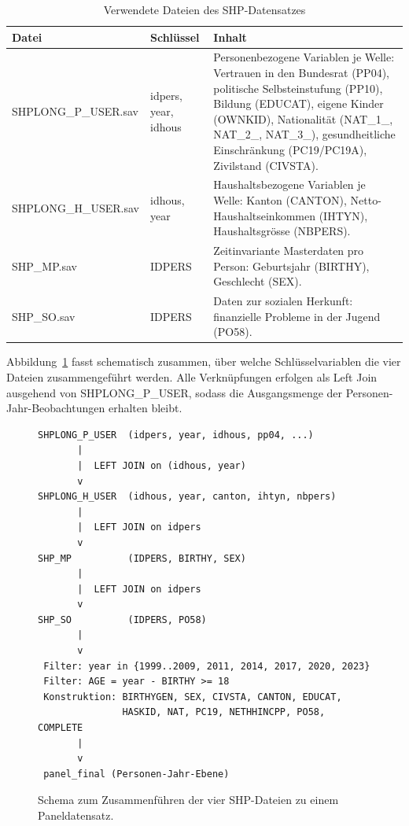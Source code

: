 \begin{table}[h]
\centering
\caption{Verwendete Dateien des SHP-Datensatzes}
\label{tab:dateien}
\renewcommand{\arraystretch}{1.2}
\begin{tabularx}{\textwidth}{@{}p{2.8cm} p{2.6cm} X@{}}
\toprule
Datei & Schlüssel & Inhalt \\
\midrule
SHPLONG\_P\_\allowbreak USER.sav &
idpers, year, idhous &
Personenbezogene Variablen je Welle: Vertrauen in den Bundesrat (PP04), politische Selbsteinstufung (PP10), Bildung (EDUCAT), eigene Kinder (OWNKID), Nationalität (NAT\_1\_, NAT\_2\_, NAT\_3\_), gesundheitliche Einschränkung (PC19/PC19A), Zivilstand (CIVSTA). \\
\addlinespace
SHPLONG\_H\_\allowbreak USER.sav &
idhous, year &
Haushaltsbezogene Variablen je Welle: Kanton (CANTON), Netto-Haushaltseinkommen (IHTYN), Haushaltsgrösse (NBPERS). \\
\addlinespace
SHP\_MP.sav &
IDPERS &
Zeitinvariante Masterdaten pro Person: Geburtsjahr (BIRTHY), Geschlecht (SEX). \\
\addlinespace
SHP\_SO.sav &
IDPERS &
Daten zur sozialen Herkunft: finanzielle Probleme in der Jugend (PO58). \\
\bottomrule
\end{tabularx}
\end{table}

Abbildung~\ref{fig:joinschema} fasst schematisch zusammen, über welche
Schlüsselvariablen die vier Dateien zusammengeführt werden. Alle Verknüpfungen
erfolgen als Left Join ausgehend von SHPLONG\_P\_USER, sodass die
Ausgangsmenge der Personen-Jahr-Beobachtungen erhalten bleibt.

\begin{figure}[h]
\centering
\begin{lstlisting}[basicstyle=\ttfamily\small, frame=single, backgroundcolor=\color{white}, numbers=none]
SHPLONG_P_USER  (idpers, year, idhous, pp04, ...)
       |
       |  LEFT JOIN on (idhous, year)
       v
SHPLONG_H_USER  (idhous, year, canton, ihtyn, nbpers)
       |
       |  LEFT JOIN on idpers
       v
SHP_MP          (IDPERS, BIRTHY, SEX)
       |
       |  LEFT JOIN on idpers
       v
SHP_SO          (IDPERS, PO58)
       |
       v
 Filter: year in {1999..2009, 2011, 2014, 2017, 2020, 2023}
 Filter: AGE = year - BIRTHY >= 18
 Konstruktion: BIRTHYGEN, SEX, CIVSTA, CANTON, EDUCAT,
               HASKID, NAT, PC19, NETHHINCPP, PO58, COMPLETE
       |
       v
 panel_final (Personen-Jahr-Ebene)
\end{lstlisting}
\caption{Schema zum Zusammenführen der vier SHP-Dateien zu einem Paneldatensatz.}
\label{fig:joinschema}
\end{figure}

